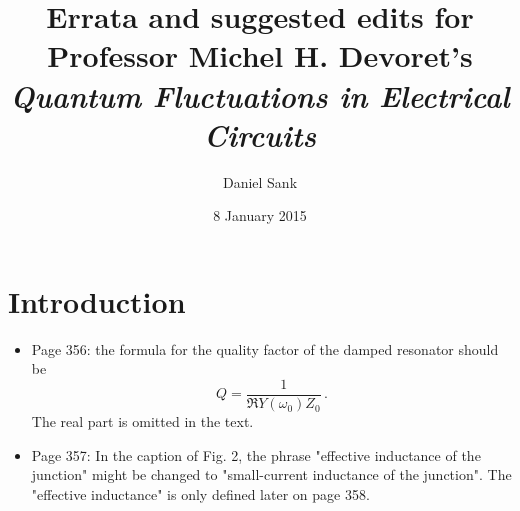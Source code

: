 \documentclass{article}
\title{Errata and suggested edits for \\
Professor Michel H. Devoret's\\
\textit{Quantum Fluctuations in Electrical Circuits}}
\author{Daniel Sank}
\date{8 January 2015}
\begin{document}
\maketitle

\section{Introduction}

\begin{itemize}

\item Page 356: the formula for the quality factor of the damped resonator should be
\begin{equation}
Q = \frac{1}{\Re{Y(\omega_0)} Z_0} \nonumber \, .
\end{equation} 
The real part is omitted in the text.

\item Page 357: In the caption of Fig. 2, the phrase "effective inductance of the junction" might be changed to "small-current inductance of the junction". The "effective inductance" is only defined later on page 358.

\end{itemize}







\end{document}
